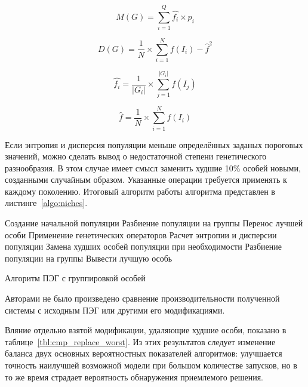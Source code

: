 \begin{equation}
\label{eq:niches_M}
M(G) = \sum\limits_{i=1}^Q{\hat{f_i} \times p_i}
\end{equation}

\begin{equation}
\label{eq:niches_D}
D(G) = \frac{1}{N} \times \sum\limits_{i=1}^{N}{{f(I_i) - \hat{f}}^2}
\end{equation}

\begin{equation}
\label{eq:niches_f_i_hat}
\hat{f_i} = \frac{1}{|G_i|} \times \sum\limits_{j=1}^{|G_i|}{f(I_j)}
\end{equation}

\begin{equation}
\label{eq:niches_f_hat}
\hat{f} = \frac{1}{N} \times \sum\limits_{i=1}^{N}{f(I_i)}
\end{equation}

Если энтропия и дисперсия популяции меньше определённых заданых пороговых значений, можно сделать вывод о недостаточной степени генетического разнообразия. В этом случае имеет смысл заменить худшие 10\% особей новыми, созданными случайным образом. Указанные операции требуется применять к каждому поколению. Итоговый алгоритм работы алгоритма представлен в листинге~\ref{algo:niches}.

\begin{algorithm}
\SetAlgoLined
{}
{
  Создание начальной популяции\;
  Разбиение популяции на группы\;
  {
    Перенос лучшей особи\;
    Применение генетических операторов\;
  }
  Расчет энтропии и дисперсии популяции\;
  Замена худших особей популяции при необходимости\;
  Разбиение популяции на группы\;
}
Вывести лучшую особь\;
\caption{Алгоритм ПЭГ с группировкой особей}
\label{algo:niches}
\end{algorithm}

Авторами не было произведено сравнение производительности полученной системы с исходным ПЭГ или другими его модификациями.

Вляние отдельно взятой модификации, удаляющие худшие особи, показано в таблице~\ref{tbl:cmp_replace_worst}. Из этих результатов следует изменение баланса двух основных вероятностных показателей алгоритмов: улучшается точность наилучшей возможной модели при большом количестве запусков, но в то же время страдает вероятность обнаружения приемлемого решения.



